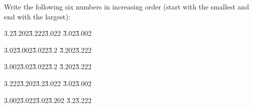\documentclass[10pt,answers]{exam}
\begin{document}
\begin{questions}

\question Write the following six numbers in increasing order (start with the smallest and end with the largest): 

\begin{tabbing}
3.2\quad\quad\=  \= 3.202\quad\quad\=  \= 3.222\quad\quad \=  \= 
3.022 \quad\quad\=  \= 3.02\quad\quad \=  \= 3.002\\
\end{tabbing}

\begin{choices}

\choice 
\begin{tabbing}
3.02\quad\quad\=  \= 3.002\quad\quad\=  \= 3.022\quad\quad \=  \= 
3.2 \quad\quad\=  \= 3.202\quad\quad \=  \= 3.222\\
\end{tabbing}

\CorrectChoice 
\begin{tabbing}
3.002\quad\quad\=  \= 3.02\quad\quad\=  \= 3.022\quad\quad \=  \= 
3.2 \quad\quad\=  \= 3.202\quad\quad \=  \= 3.222\\
\end{tabbing}

\choice 
\begin{tabbing}
3.222\quad\quad\=  \= 3.202\quad\quad\=  \= 3.2\quad\quad \=  \= 
3.022 \quad\quad\=  \= 3.02\quad\quad \=  \= 3.002\\
\end{tabbing}

\choice 
\begin{tabbing}
3.002\quad\quad\=  \= 3.022\quad\quad\=  \= 3.02\quad\quad \=  \= 
3.202 \quad\quad\=  \= 3.2\quad\quad \=  \= 3.222\\
\end{tabbing}
\end{choices}








\end{questions}
\end{document}
